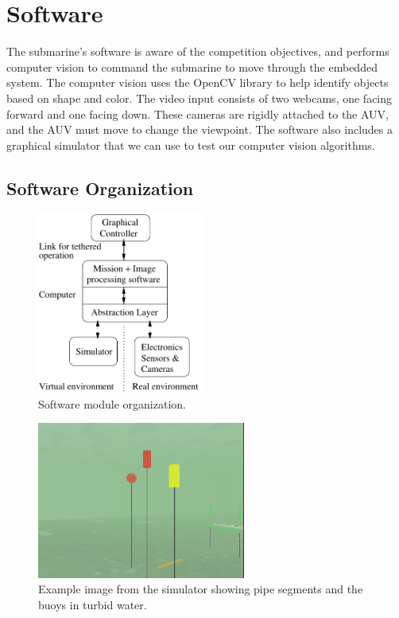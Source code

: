 \section{Software}

The submarine's software is aware of the competition objectives, and performs computer vision to
command the submarine to move through the embedded system.
The computer vision uses the OpenCV library to help identify objects based on shape and color.
The video input consists of two webcams, one facing forward and one facing down.
These cameras are rigidly attached to the AUV, and the AUV must move to change the viewpoint.
The software also includes a graphical simulator that we can use to test our computer vision algorithms.

\subsection{Software Organization}
\label{gui}


\begin{figure}
\begin{center}
 \includegraphics[width=2.2in]{fig/vision}
\caption{Software module organization.}\label{vision}
\end{center}
\end{figure}


\begin{figure}
\begin{center}
 \includegraphics[width=2.7in]{fig/sim.png}
\caption{Example image from the simulator showing pipe segments and the buoys
         in turbid water.}\label{sim}
\end{center}
\end{figure}


